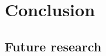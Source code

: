 \section{Conclusion} \label{conclusion}


\subsection{Future research} \label{conclusion:future_research}